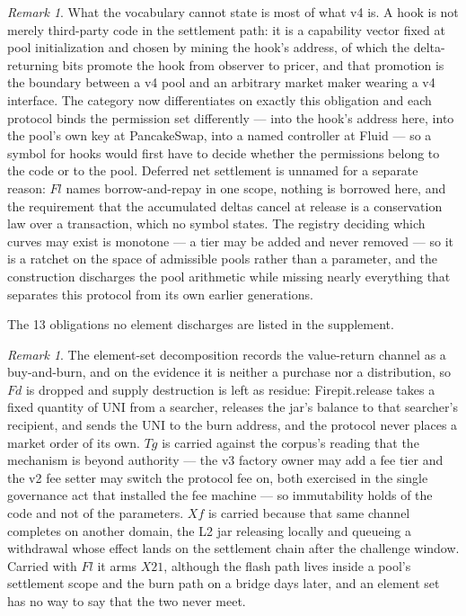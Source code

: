 \documentclass[11pt,reqno]{amsart}
\theoremstyle{plain}
\theoremstyle{definition}
\theoremstyle{remark}
\newtheorem{remark}[theorem]{Remark}
\begin{document}
\begin{remark}
What the vocabulary cannot state is most of what v4 is. A hook is not merely third-party code in the settlement path: it is a capability vector fixed at pool initialization and chosen by mining the hook's address, of which the delta-returning bits promote the hook from observer to pricer, and that promotion is the boundary between a v4 pool and an arbitrary market maker wearing a v4 interface. The category now differentiates on exactly this obligation and each protocol binds the permission set differently --- into the hook's address here, into the pool's own key at PancakeSwap, into a named controller at Fluid --- so a symbol for hooks would first have to decide whether the permissions belong to the code or to the pool. Deferred net settlement is unnamed for a separate reason: $Fl$ names borrow-and-repay in one scope, nothing is borrowed here, and the requirement that the accumulated deltas cancel at release is a conservation law over a transaction, which no symbol states. The registry deciding which curves may exist is monotone --- a tier may be added and never removed --- so it is a ratchet on the space of admissible pools rather than a parameter, and the construction discharges the pool arithmetic while missing nearly everything that separates this protocol from its own earlier generations.

The 13 obligations no element discharges are listed in the supplement.
\end{remark}

\begin{remark}
The element-set decomposition records the value-return channel as a buy-and-burn, and on the evidence it is neither a purchase nor a distribution, so $Fd$ is dropped and supply destruction is left as residue: Firepit.release takes a fixed quantity of UNI from a searcher, releases the jar's balance to that searcher's recipient, and sends the UNI to the burn address, and the protocol never places a market order of its own. $Tg$ is carried against the corpus's reading that the mechanism is beyond authority --- the v3 factory owner may add a fee tier and the v2 fee setter may switch the protocol fee on, both exercised in the single governance act that installed the fee machine --- so immutability holds of the code and not of the parameters. $Xf$ is carried because that same channel completes on another domain, the L2 jar releasing locally and queueing a withdrawal whose effect lands on the settlement chain after the challenge window. Carried with $Fl$ it arms $X21$, although the flash path lives inside a pool's settlement scope and the burn path on a bridge days later, and an element set has no way to say that the two never meet.
\end{remark}
\end{document}
